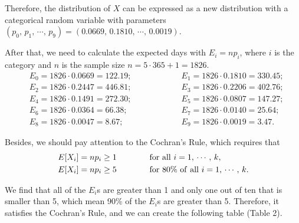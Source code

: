 \documentclass[a4paper]{article}
\begin{document}
	Therefore, the distribution of $X$ can be expressed as a new distribution with a categorical random variable with parameters $(p_0,\,p_1,\,\cdots,\,p_9)=(0.0669,\, 0.1810,\,\cdots,\,0.0019)$.

	After that, we need to calculate the expected days with $E_i=np_i$, where $i$ is the category and $n$ is the sample size $n=5\cdot365+1=1826$.
\begin{equation}
\begin{split}
&E_0=1826\cdot0.0669=122.19; \qquad \qquad \qquad E_1=1826\cdot0.1810=330.45;  \\
&E_2=1826\cdot0.2447=446.81; \qquad \qquad \qquad E_3=1826\cdot0.2206=402.76;  \\
&E_4=1826\cdot0.1491=272.30; \qquad \qquad \qquad E_5=1826\cdot0.0807=147.27;  \\
&E_6=1826\cdot0.0364=66.38; \qquad \qquad \qquad \,\, \, E_7=1826\cdot0.0140=25.64;  \\
&E_8=1826\cdot0.0047=8.67; \qquad \qquad \qquad\,\, \,\,\, \, E_9=1826\cdot0.0019=3.47.
\nonumber
\end{split}
\end{equation}

	Besides, we should pay attention to the Cochran's Rule, which requires that
\begin{equation}
\begin{split}
&E[X_i]=np_i\ge1\qquad \qquad {\rm for\ all}\ i=1,\,\cdots,\,k,\\
&E[X_i]=np_i\ge5\qquad \qquad {\rm for\ 80\% \ of\ all}\ i=1,\,\cdots,\,k.
\nonumber
\end{split}
\end{equation}

	We find that all of the $E_i$s are greater than 1 and only one out of ten that is smaller than 5, which mean 90\% of the $E_i$s are greater than 5. Therefore, it satisfies the Cochran's Rule, and we can create the following table (Table 2).

\begin{table}[H]
\centering
\begin{spacing}{1.10}
\end{spacing}
\caption{Expected and observed days with different numbers of fatal police shootings.}
\end{table}
\end{document}
